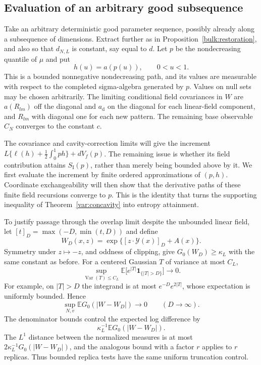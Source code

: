 \subsection{Evaluation of an arbitrary good subsequence}

Take an arbitrary deterministic good parameter sequence, possibly
already along a subsequence of dimensions.  Extract further as in
Proposition~\ref{bulk:restoration}, and also so that $d_{N,L}$ is
constant, say equal to $d$.  Let $p$ be the nondecreasing quantile of
$\mu$ and put
\begin{equation}\label{cav:field-path}
 h(u)=a(p(u)),\qquad 0<u<1.
\end{equation}
This is a bounded nonnegative nondecreasing path, and its values are
measurable with respect to the completed sigma-algebra generated by
$p$.  Values on null sets may be chosen arbitrarily.  The limiting
conditional field covariances in $W$ are $a(R_{lm})$ off the diagonal
and $a_{\mathrm d}$ on the diagonal for each linear-field component,
and $R_{lm}$ with diagonal one for each new pattern.  The remaining
base observable $C_N$ converges to the constant $c$.

The covariance and cavity-correction limits will give the increment
$L\{\ell(h)+\frac12\int_0^1ph\}+dV_f(p)$.
The remaining issue is whether its field contribution attains
$S_{\mathrm I}(p)$, rather than merely being bounded above by it.
We first evaluate the increment by finite ordered approximations of
$(p,h)$.  Coordinate exchangeability will then show that the derivative
paths of these finite field recursions converge to $p$.  This is the
identity that turns the supporting inequality of
Theorem~\ref{var:concavity} into entropy attainment.

To justify passage through the overlap limit despite the unbounded
linear field, let $[t]_D=\max(-D,\min(t,D))$ and define
\[
 W_D(x,z)=\exp\{[z\cdot\mathcal Y(x)]_D+A(x)\}.
\]
Symmetry under $z\mapsto-z$, and oddness of clipping, give
$G_0(W_D)\ge\kappa_L$ with the same constant as before.
For a centered Gaussian $T$ of variance at most $C_L$,
\[
 \sup_{\operatorname{Var}(T)\le C_L}
 \mathbb E\big[e^{|T|}\mathbf 1_{\{|T|>D\}}\big]\longrightarrow0.
\]
For example, on $|T|>D$ the integrand is at most
$e^{-D}e^{2|T|}$, whose expectation is uniformly bounded.  Hence
\begin{equation}\label{cav:truncation-error}
 \sup_{N,v}\mathbb E G_0(|W-W_D|)\longrightarrow0
 \qquad(D\to\infty).
\end{equation}
The denominator bounds control the expected log difference by
\[
 \kappa_L^{-1}\mathbb E G_0(|W-W_D|).
\]
The $L^1$ distance between the normalized measures is at most
$2\kappa_L^{-1}G_0(|W-W_D|)$, and the analogous bound with a factor
$r$ applies to $r$ replicas.  Thus bounded replica tests have the same
uniform truncation control.

